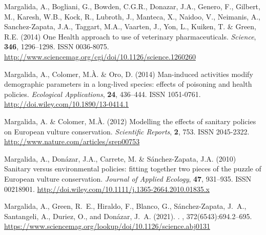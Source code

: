 \documentclass[12pt]{article}
\begin{document}
\begin{thebibliography}{87}
	Margalida, A., Bogliani, G., Bowden, C.G.R., Donazar, J.A., Genero, F.,
	Gilbert, M., Karesh, W.B., Kock, R., Lubroth, J., Manteca, X., Naidoo, V.,
	Neimanis, A., Sanchez-Zapata, J.A., Taggart, M.A., Vaarten, J., Yon, L.,
	Kuiken, T. \& Green, R.E. (2014) {One Health approach to use of veterinary
		pharmaceuticals}.
	\newblock \emph{Science}, \textbf{346}, 1296--1298.
	\newblock ISSN 0036-8075.
	\newline\urlprefix\url{http://www.sciencemag.org/cgi/doi/10.1126/science.1260260}
	
	Margalida, A., Colomer, M.{\`{A}}. \& Oro, D. (2014) {Man-induced activities
		modify demographic parameters in a long-lived species: effects of poisoning
		and health policies}.
	\newblock \emph{Ecological Applications}, \textbf{24}, 436--444.
	\newblock ISSN 1051-0761.
	\newline\urlprefix\url{http://doi.wiley.com/10.1890/13-0414.1}
	
	Margalida, A. \& Colomer, M.{\`{A}}. (2012) {Modelling the effects of sanitary
		policies on European vulture conservation}.
	\newblock \emph{Scientific Reports}, \textbf{2}, 753.
	\newblock ISSN 2045-2322.
	\newline\urlprefix\url{http://www.nature.com/articles/srep00753}
	
	Margalida, A., Don{\'{a}}zar, J.A., Carrete, M. \& S{\'{a}}nchez-Zapata, J.A.
	(2010) {Sanitary versus environmental policies: fitting together two pieces
		of the puzzle of European vulture conservation}.
	\newblock \emph{Journal of Applied Ecology}, \textbf{47}, 931--935.
	\newblock ISSN 00218901.
	\newline\urlprefix\url{http://doi.wiley.com/10.1111/j.1365-2664.2010.01835.x}
	
	Margalida, A., Green, R.~E., Hiraldo, F., Blanco, G., S{\'{a}}nchez-Zapata,
	J.~A., Santangeli, A., Duriez, O., and Don{\'{a}}zar, J.~A. (2021).
	.
	, 372(6543):694.2--695.
	\newline\urlprefix\url{https://www.sciencemag.org/lookup/doi/10.1126/science.abj0131}
	

\end{thebibliography}
\end{document}
